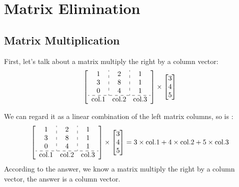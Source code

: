 \section{Matrix Elimination}
    \subsection{Matrix Multiplication}
        First, let's talk about a matrix multiply the right by a column vector:
            \begin{equation}
                \left[
                \begin{array}{c:c:c}
                1 & 2 & 1 \\
                3 & 8 & 1 \\
                0 & 4 & 1 \\
                \hdashline
                \multicolumn{1}{c}{\text{col.1}} & \multicolumn{1}{c}{\text{col.2}} & \multicolumn{1}{c}{\text{col.3}}
                \end{array}
                \right]
                \times
                \begin{bmatrix}
                    3\\
                    4\\
                    5
                \end{bmatrix}
            \end{equation}
    
            We can regard it as a linear combination of the left matrix columns,
            so is :
                \begin{equation}
                    \left[
                    \begin{array}{c:c:c}
                    1 & 2 & 1 \\
                    3 & 8 & 1 \\
                    0 & 4 & 1 \\
                    \hdashline
                    \multicolumn{1}{c}{\text{col.1}} & \multicolumn{1}{c}{\text{col.2}} & \multicolumn{1}{c}{\text{col.3}}
                    \end{array}
                    \right]
                    \times
                    \begin{bmatrix}
                        3\\
                        4\\
                        5
                    \end{bmatrix}
                    = 
                    3 \times \mathrm{col.1} + 4 \times \mathrm{col.2} + 5 \times \mathrm{col.3}
                \end{equation}
            According to the answer, we know a matrix multiply the right by a column vector, the answer is a column vector.

